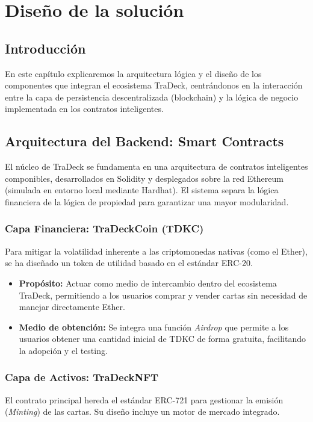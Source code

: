 \chapter{Diseño de la solución}\label{cap:diseño}

\section{Introducción}
En este capítulo explicaremos la arquitectura lógica y el diseño de los componentes 
que integran el ecosistema TraDeck, centrándonos en la interacción entre la capa de 
persistencia descentralizada (blockchain) y la lógica de negocio implementada en los 
contratos inteligentes.


\section{Arquitectura del Backend: Smart Contracts}
El núcleo de TraDeck se fundamenta en una arquitectura de contratos inteligentes componibles, 
desarrollados en Solidity y desplegados sobre la red Ethereum (simulada en entorno local mediante Hardhat). 
El sistema separa la lógica financiera de la lógica de propiedad para garantizar una mayor modularidad.

\subsection{Capa Financiera: TraDeckCoin (TDKC)}
Para mitigar la volatilidad inherente a las criptomonedas nativas (como el Ether), se ha diseñado un 
token de utilidad basado en el estándar ERC-20.

\begin{itemize}
    \item \textbf{Propósito:} Actuar como medio de intercambio dentro del ecosistema TraDeck, permitiendo a 
        los usuarios comprar y vender cartas sin necesidad de manejar directamente Ether.
    \item \textbf{Medio de obtención:} Se integra una función \textit{Airdrop} que permite a los usuarios 
        obtener una cantidad inicial de TDKC de forma gratuita, facilitando la adopción y el testing.
\end{itemize}


\subsection{Capa de Activos: TraDeckNFT}
El contrato principal hereda el estándar ERC-721 para gestionar la emisión (\textit{Minting}) de las cartas. 
Su diseño incluye un motor de mercado integrado.

